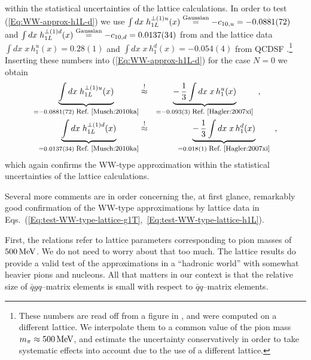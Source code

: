 \documentclass[a4paper,11pt]{article}
\newcommand{\ba}{\begin{eqnarray}}
\newcommand{\ea}{\end{eqnarray}}
\begin{document}
within the statistical uncertainties of the lattice calculations.
%
In order to test (\ref{Eq:WW-approx-h1L-d}) we use
$\int dx\;h_{1L}^{\perp(1)u}(x)\stackrel{\text{\scriptsize Gaussian}}{=}
-c_{10,u}=-0.0881(72)$ 
and
$\int dx\;h_{1L}^{\perp(1)d}(x)\stackrel{\text{\scriptsize Gaussian}}{=}
-c_{10,d}=0.0137(34)$
from \cite{Musch:2010ka} and the lattice data 
$\int d x \;x\,h_1^u(x)= 0.28(1)$ and
$\int d x \;x\,h_1^d(x)= -0.054(4)$
from QCDSF \cite{Gockeler:2005cj}.\footnote{
  These numbers are read off from a figure in \cite{Gockeler:2005cj},
  and were computed on a different lattice. We interpolate them to a
  common value of the pion mass $m_\pi\approx500\,{\rm MeV}$, and
  estimate the uncertainty conservatively in order to take systematic effects
  into account due to the use of a different lattice.}
Inserting these numbers into  (\ref{Eq:WW-approx-h1L-d}) for the case
$N=0$ we obtain
\ba
        \underbrace{\int d x\;h_{1L}^{\perp(1)u}(x)}
        _{= -0.0881(72)\;\mbox{\footnotesize Ref.~\cite{Musch:2010ka}}}
        &\stackrel{!}{\approx}&
        \underbrace{-\,\frac{1}{3}\int d x\;x\,h_1^u(x)}
        _{= -0.093(3) \;\mbox{\footnotesize Ref.~\cite{Hagler:2007xi}}}
        \hspace{2mm} , \hspace{7mm} \nonumber \\
        \underbrace{\int d x\;h_{1L}^{\perp(1)d}(x)}
        _{= 0.0137(34) \;\mbox{\footnotesize Ref.~\cite{Musch:2010ka}}}
        &\stackrel{!}{\approx}&
        \underbrace{-\,\frac{1}{3}\int d x\;x\,h_1^d(x)}
        _{= 0.018(1) \;\mbox{\footnotesize Ref.~\cite{Hagler:2007xi}}}
        \hspace{2mm}, 
        \label{Eq:test-WW-type-lattice-h1L}
\ea
which again confirms the WW-type approximation within the statistical
uncertainties of the lattice calculations.

Several more comments are in order concerning the, at first glance, remarkably
good confirmation of the  WW-type approximations by lattice data in
Eqs.~(\ref{Eq:test-WW-type-lattice-g1T},~\ref{Eq:test-WW-type-lattice-h1L}).

First, the relations refer to lattice parameters corresponding
to pion masses of $500\,{\rm MeV}$. We do not
need to worry about that too much. The lattice results do provide
a valid test of the approximations in a ``hadronic world'' with
somewhat heavier pions and nucleons. All that matters in our
context is that the relative size of $\bar{q}gq$--matrix elements
is small with respect to $\bar{q}q$--matrix elements.
\end{document}
